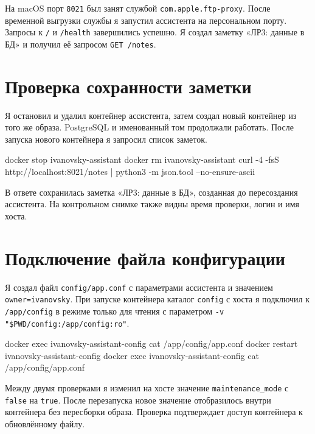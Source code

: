 На macOS порт \texttt{8021} был занят службой \texttt{com.apple.ftp-proxy}. После временной выгрузки службы я запустил ассистента на персональном порту. Запросы к \texttt{/} и \texttt{/health} завершились успешно. Я создал заметку «ЛР3: данные в БД» и получил её запросом \texttt{GET /notes}.


\chapter{Проверка сохранности заметки}
Я остановил и удалил контейнер ассистента, затем создал новый контейнер из того же образа. PostgreSQL и именованный том продолжали работать. После запуска нового контейнера я запросил список заметок.

\begin{code}
docker stop ivanovsky-assistant
docker rm ivanovsky-assistant
curl -4 -fsS http://localhost:8021/notes |
  python3 -m json.tool --no-ensure-ascii
\end{code}

В ответе сохранилась заметка «ЛР3: данные в БД», созданная до пересоздания ассистента. На контрольном снимке также видны время проверки, логин и имя хоста.


\chapter{Подключение файла конфигурации}
Я создал файл \texttt{config/app.conf} с параметрами ассистента и значением \texttt{owner=ivanovsky}. При запуске контейнера каталог \texttt{config} с хоста я подключил к \texttt{/app/config} в режиме только для чтения с параметром \texttt{-v "\$PWD/config:/app/config:ro"}.

\begin{code}
docker exec ivanovsky-assistant-config cat /app/config/app.conf
docker restart ivanovsky-assistant-config
docker exec ivanovsky-assistant-config cat /app/config/app.conf
\end{code}

Между двумя проверками я изменил на хосте значение \texttt{maintenance\_mode} с \texttt{false} на \texttt{true}. После перезапуска новое значение отобразилось внутри контейнера без пересборки образа. Проверка подтверждает доступ контейнера к обновлённому файлу.

